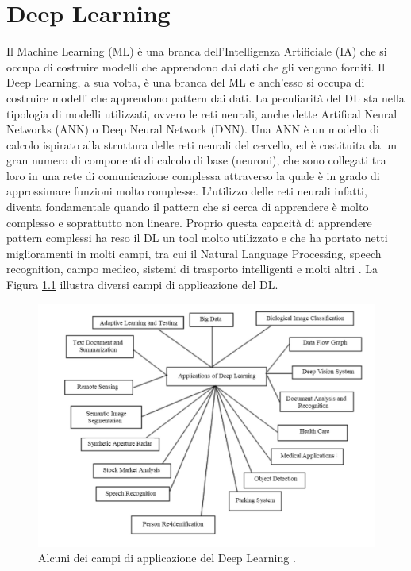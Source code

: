 \chapter{Deep Learning}
\label{deep_learning}
Il Machine Learning (ML) è una branca dell’Intelligenza Artificiale (IA) che si occupa di costruire modelli che apprendono dai dati che gli vengono forniti. Il Deep Learning, a sua volta, è una branca del ML e anch’esso si occupa di costruire modelli che apprendono pattern dai dati. La peculiarità del DL sta nella tipologia di modelli utilizzati, ovvero le reti neurali, anche dette Artifical Neural Networks (ANN) o Deep Neural Network (DNN). Una ANN è un modello di calcolo ispirato alla struttura delle reti neurali del cervello, ed è costituita da un gran numero di componenti di calcolo di base (neuroni), che sono collegati tra loro in una rete di comunicazione complessa attraverso la quale è in grado di approssimare funzioni molto complesse.
L’utilizzo delle reti neurali infatti, diventa fondamentale quando il pattern che si cerca di apprendere è molto complesso e soprattutto non lineare. Proprio questa capacità di apprendere pattern complessi ha reso il DL un tool molto utilizzato e che ha portato netti miglioramenti in molti campi, tra cui il Natural Language Processing, speech recognition, campo medico, sistemi di trasporto intelligenti \cite{dlsurvey} e molti altri \cite{dlsurvey2}. La Figura \ref{fig:appl_dl} illustra diversi campi di applicazione del DL.
\begin{figure}[h!]
    \centering
    \includegraphics[scale=0.39]{img/applications_DL.png}
    \caption{Alcuni dei campi di applicazione del Deep Learning \cite{dlsurvey2}.}
    \label{fig:appl_dl}
\end{figure}
